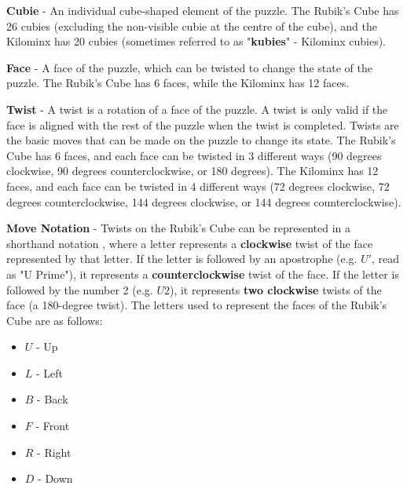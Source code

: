 \textbf{Cubie} - An individual cube-shaped element of the puzzle. The Rubik's Cube has 26 cubies (excluding the non-visible cubie at the centre of the cube), and the Kilominx has 20 cubies (sometimes referred to as "\textbf{kubies}" - Kilominx cubies).

\textbf{Face} - A face of the puzzle, which can be twisted to change the state of the puzzle. The Rubik's Cube has 6 faces, while the Kilominx has 12 faces.

\textbf{Twist} - A twist is a rotation of a face of the puzzle. A twist is only valid if the face is aligned with the rest of the puzzle when the twist is completed. Twists are the basic moves that can be made on the puzzle to change its state. The Rubik's Cube has 6 faces, and each face can be twisted in 3 different ways (90 degrees clockwise, 90 degrees counterclockwise, or 180 degrees). The Kilominx has 12 faces, and each face can be twisted in 4 different ways (72 degrees clockwise, 72 degrees counterclockwise, 144 degrees clockwise, or 144 degrees counterclockwise).

\textbf{Move Notation}\label{section:moves} - Twists on the Rubik's Cube can be represented in a shorthand notation \cite{rubiksnotation}, where a letter represents a \textbf{clockwise} twist of the face represented by that letter. If the letter is followed by an apostrophe (e.g. $U'$, read as "U Prime"), it represents a \textbf{counterclockwise} twist of the face. If the letter is followed by the number 2 (e.g. $U2$), it represents \textbf{two clockwise} twists of the face (a 180-degree twist). The letters used to represent the faces of the Rubik's Cube are as follows:
\begin{multicols}{2}
\begin{itemize}
    \item $U$ - Up
    \item $L$ - Left
    \item $B$ - Back
    \item $F$ - Front
    \item $R$ - Right
    \item $D$ - Down
\end{itemize}
\end{multicols}


